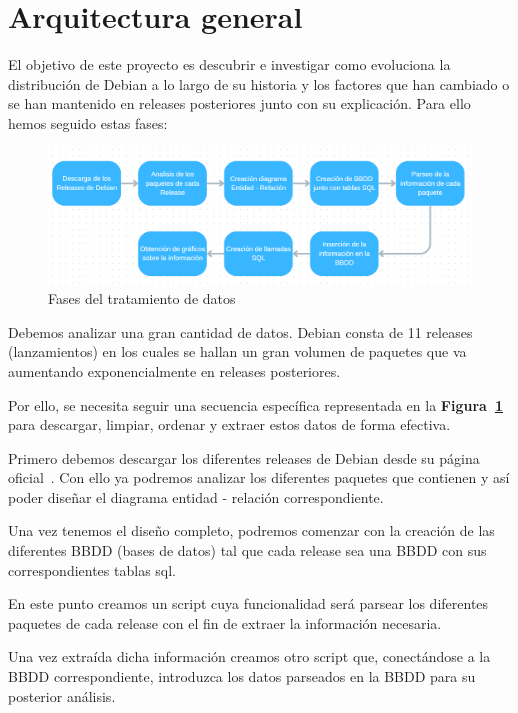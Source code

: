 \documentclass[a4paper, 12pt]{book}
\begin{document}
\section{Arquitectura general} 
\label{sec:arquitectura}
El objetivo de este proyecto es descubrir e investigar como evoluciona la distribución de Debian a lo largo de su historia y los factores que han cambiado o se han mantenido en releases posteriores junto con su explicación. Para ello hemos seguido estas fases:
\begin{figure}[h]
	\centering
	\includegraphics[width=14cm, keepaspectratio]{img/Diagrama_general.png}
	\caption{Fases del tratamiento de datos}
	\label{fig:Diagrama_general}
\end{figure}

Debemos analizar una gran cantidad de datos. Debian consta de 11 releases (lanzamientos) en los cuales se hallan un gran volumen de paquetes que va aumentando exponencialmente en releases posteriores.

Por ello, se necesita seguir una secuencia específica representada en la \textbf {Figura~\ref{fig:Diagrama_general}} para descargar, limpiar, ordenar y extraer estos datos de forma efectiva. 

Primero debemos descargar los diferentes releases de Debian desde su página oficial~\cite{debian:_releases}.
Con ello ya podremos analizar los diferentes paquetes que contienen y así poder diseñar el diagrama entidad - relación correspondiente.

Una vez tenemos el diseño completo, podremos comenzar con la creación de las diferentes BBDD (bases de datos) tal que cada release sea una BBDD con sus correspondientes tablas sql.

En este punto creamos un script cuya funcionalidad será parsear los diferentes paquetes de cada release con el fin de extraer la información necesaria.

Una vez extraída dicha información creamos otro script que, conectándose a la BBDD correspondiente, introduzca los datos parseados en la BBDD para su posterior análisis.
\end{document}
